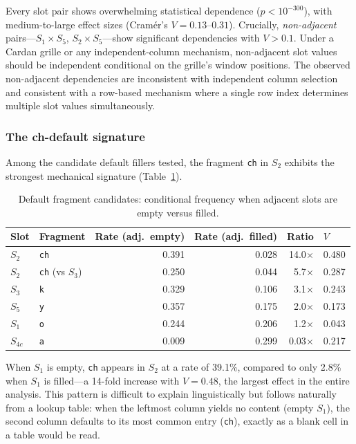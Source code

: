 \documentclass[12pt]{article}
\begin{document}
Every slot pair shows overwhelming statistical dependence ($p < 10^{-300}$), with medium-to-large effect sizes (Cram\'{e}r's $V = 0.13$--$0.31$). Crucially, \emph{non-adjacent} pairs---$S_1 \times S_5$, $S_2 \times S_5$---show significant dependencies with $V > 0.1$. Under a Cardan grille or any independent-column mechanism, non-adjacent slot values should be independent conditional on the grille's window positions. The observed non-adjacent dependencies are inconsistent with independent column selection and consistent with a row-based mechanism where a single row index determines multiple slot values simultaneously.

\subsubsection{The ch-default signature}
\label{sec:chdefault}

Among the candidate default fillers tested, the fragment \texttt{ch} in $S_2$ exhibits the strongest mechanical signature (Table~\ref{tab:defaults}).

\begin{table}[ht]
\centering
\caption{Default fragment candidates: conditional frequency when adjacent slots are empty versus filled.}
\label{tab:defaults}
\begin{tabular}{llrrrl}
\toprule
Slot & Fragment & Rate (adj.\ empty) & Rate (adj.\ filled) & Ratio & $V$ \\
\midrule
$S_2$ & \texttt{ch} & 0.391 & 0.028 & 14.0$\times$ & 0.480 \\
$S_2$ & \texttt{ch} (vs $S_3$) & 0.250 & 0.044 & 5.7$\times$ & 0.287 \\
$S_3$ & \texttt{k} & 0.329 & 0.106 & 3.1$\times$ & 0.243 \\
$S_5$ & \texttt{y} & 0.357 & 0.175 & 2.0$\times$ & 0.173 \\
$S_1$ & \texttt{o} & 0.244 & 0.206 & 1.2$\times$ & 0.043 \\
$S_{4c}$ & \texttt{a} & 0.009 & 0.299 & 0.03$\times$ & 0.217 \\
\bottomrule
\end{tabular}
\end{table}

When $S_1$ is empty, \texttt{ch} appears in $S_2$ at a rate of 39.1\%, compared to only 2.8\% when $S_1$ is filled---a 14-fold increase with $V = 0.48$, the largest effect in the entire analysis. This pattern is difficult to explain linguistically but follows naturally from a lookup table: when the leftmost column yields no content (empty $S_1$), the second column defaults to its most common entry (\texttt{ch}), exactly as a blank cell in a table would be read.
\end{document}
